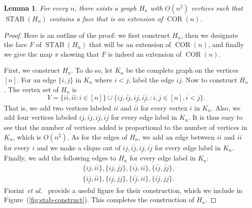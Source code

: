 \documentclass{article}
\makeatletter
\newtheorem{lemma}[theorem]{\sc Lemma}
\theoremstyle{definition}
\theoremstyle{remark}
\newcommand{\cetal}{\textit{et al.\@}}  %
\newcommand{\ol}[1]{\overline{#1}}
\newcommand{\ul}[1]{\underline{#1}}
\newcommand{\oul}[1]{\overline{\underline{#1}}}
\newcommand{\STAB}{\operatorname{STAB}}
\newcommand{\COR}{\operatorname{COR}}
\makeatother
\begin{document}
\begin{lemma}\label{lem:stab-reduct}
For every $n$, there exists a graph $H_n$ with $O(n^2)$ vertices such that $\STAB(H_n)$ contains a face that is an extension of $\COR(n)$.
\end{lemma}
\begin{proof}
Here is an outline of the proof: we first construct $H_n$, then we designate the face $F$ of $\STAB(H_n)$ that will be an extension of $\COR(n)$, and finally we give the map $\pi$ showing that $F$ is indeed an extension of $\COR(n)$.

First, we construct $H_n$. To do so, let $K_n$ be the complete graph on the vertices $[n]$. For an edge $\{i, j\}$ in $K_n$ where $i < j$, label the edge $ij$. Now to construct $H_n$. The vertex set of $H_n$ is
\[
V = \{ii, \ol{ii} : i \in [n]\} \cup \{ij, \ol{ij}, \ul{ij}, \oul{ij}, : i,j \in [n], i < j\}.
\]
That is, we add two vertices labeled $ii$ and $\ol{ii}$ for every vertex $i$ in $K_n$. Also, we add four vertices labeled $ij, \ol{ij}, \ul{ij}, \oul{ij}$ for every edge label in $K_n$. It is thus easy to see that the number of vertices added is proportional to the number of vertices in $K_n$, which is $O(n^2)$. As for the edges of $H_n$, we add an edge between $ii$ and $\ol{ii}$ for every $i$ and we make a clique out of $ij, \ol{ij}, \ul{ij}, \oul{ij}$ for every edge label in $K_n$. Finally, we add the following edges to $H_n$ for every edge label in $K_n$:
\begin{align*}
&\{ij, \ol{ii}\}, \{ij, \ol{jj}\}, \{\ol{ij}, ii\}, \{\ol{ij}, \ol{jj}\},\\
&\{\ul{ij}, \ol{ii}\}, \{\ul{ij}, jj\}, \{\oul{ij}, ii\}, \{\oul{ij}, jj\}.
\end{align*}
Fiorini~\cetal~\cite{fiorini} provide a useful figure for their construction, which we include in Figure~(\ref{fig:stab-construct}). This completes the construction of $H_n$.


\end{proof}
\end{document}
